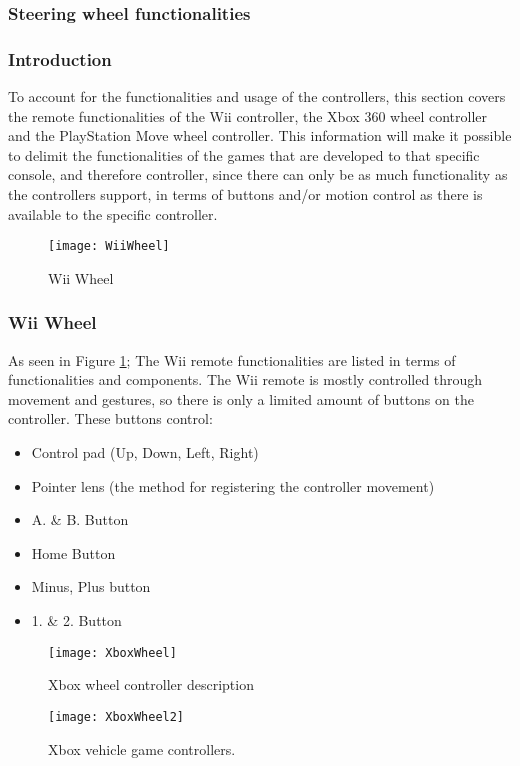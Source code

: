 \subsubsection{Steering wheel functionalities}
\subsubsection*{Introduction}
To account for the functionalities and usage of the controllers, this section covers the remote functionalities of the Wii controller, the Xbox 360 wheel controller and the PlayStation Move wheel controller. This information will make it possible to delimit the functionalities of the games that are developed to that specific console, and therefore controller, since there can only be as much functionality as the controllers support, in terms of buttons and/or motion control as there is available to the specific controller.

\begin{figure}[h] 
\centering
\texttt{[image: WiiWheel]} 
\caption{Wii Wheel}
\label{fig:Wiimote}
\end{figure}
\bigskip

\subsubsection*{Wii Wheel}
\parencite{Nintendo2013}\newline
As seen in Figure \ref{fig:Wiimote}; The Wii remote functionalities are listed in terms of functionalities and components. The Wii remote is mostly controlled through movement and gestures, so there is only a limited amount of buttons on the controller. These buttons control:
\begin{itemize}
\item Control pad (Up, Down, Left, Right)
\item Pointer lens (the method for registering the controller movement)
\item A. \& B. Button
\item Home Button
\item Minus, Plus button
\item 1. \& 2. Button
\end{itemize}
\bigskip

\begin{figure}[h] 
\centering
\caption{Xbox wheel controller description \parencite{Xbox2013}}
\label{fig:XboxWheel}
\texttt{[image: XboxWheel]} 
\end{figure}
\begin{figure}[h]
\centering
\texttt{[image: XboxWheel2]}
\caption{Xbox vehicle game controllers. \parencite{Xbox2013}}
\label{fig:XboxWheel2}
\end{figure}

